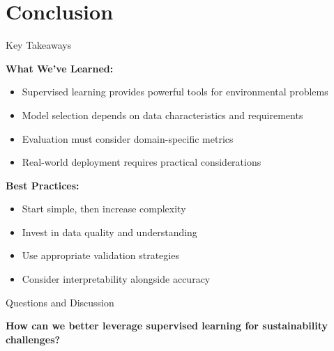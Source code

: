 \documentclass{sustainabilitylab}
\begin{document}

\section{Conclusion}

\begin{frame}{Key Takeaways}

\textbf{What We've Learned:}
\begin{itemize}
  \item Supervised learning provides powerful tools for environmental problems
  \item Model selection depends on data characteristics and requirements
  \item Evaluation must consider domain-specific metrics
  \item Real-world deployment requires practical considerations
\end{itemize}

\textbf{Best Practices:}
\begin{itemize}
  \item Start simple, then increase complexity
  \item Invest in data quality and understanding
  \item Use appropriate validation strategies
  \item Consider interpretability alongside accuracy
\end{itemize}

\end{frame}

\begin{frame}{Questions and Discussion}

\begin{center}
\Large
\textbf{How can we better leverage supervised learning for sustainability challenges?}
\end{center}

\end{frame}
\end{document}
